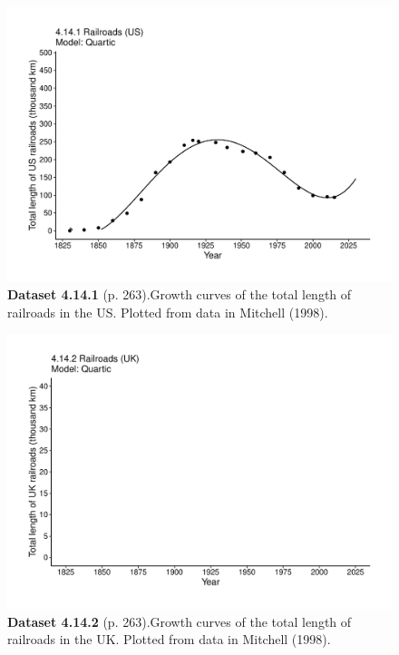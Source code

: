 \documentclass[aps,rmp,preprint,superscriptaddress,10pt,onecolumn]{article}
\begin{document}
\clearpage
\begin{figure}[h]
\includegraphics[width=\textwidth]{output/figs-ggplot/4.14.1.pdf}
\caption*{\textbf{Dataset 4.14.1} (p. 263).Growth curves of the total length of railroads in the US. Plotted from data in Mitchell (1998).}
\end{figure}
	
\clearpage
\begin{figure}[h]
\includegraphics[width=\textwidth]{output/figs-ggplot/4.14.2.pdf}
\caption*{\textbf{Dataset 4.14.2} (p. 263).Growth curves of the total length of railroads in the UK. Plotted from data in Mitchell (1998).}
\end{figure}
	
\end{document}
